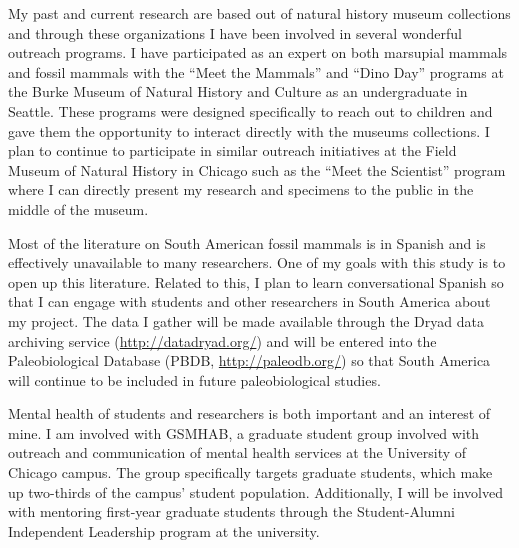 \documentclass[11pt,letterpaper]{article}
\begin{document}
My past and current research are based out of natural history museum collections and through these organizations I have been involved in several wonderful outreach programs. I have participated as an expert on both marsupial mammals and fossil mammals with the ``Meet the Mammals'' and ``Dino Day'' programs at the Burke Museum of Natural History and Culture as an undergraduate in Seattle. These programs were designed specifically to reach out to children and gave them the opportunity to interact directly with the museums collections. I plan to continue to participate in similar outreach initiatives at the Field Museum of Natural History in Chicago such as the ``Meet the Scientist'' program where I can directly present my research and specimens to the public in the middle of the museum.

Most of the literature on South American fossil mammals is in Spanish and is effectively unavailable to many researchers. One of my goals with this study is to open up this literature. Related to this, I plan to learn conversational Spanish so that I can engage with students and other researchers in South America about my project. The data I gather will be made available through the Dryad data archiving service (\url{http://datadryad.org/}) and will be entered into the Paleobiological Database (PBDB, \url{http://paleodb.org/}) so that South America will continue to be included in future paleobiological studies. 

Mental health of students and researchers is both important and an interest of mine. I am involved with GSMHAB, a graduate student group involved with outreach and communication of mental health services at the University of Chicago campus. The group specifically targets graduate students, which make up two-thirds of the campus' student population. Additionally, I will be involved with mentoring first-year graduate students through the Student-Alumni Independent Leadership program at the university.


\clearpage
\setcounter{page}{1}

\end{document}
